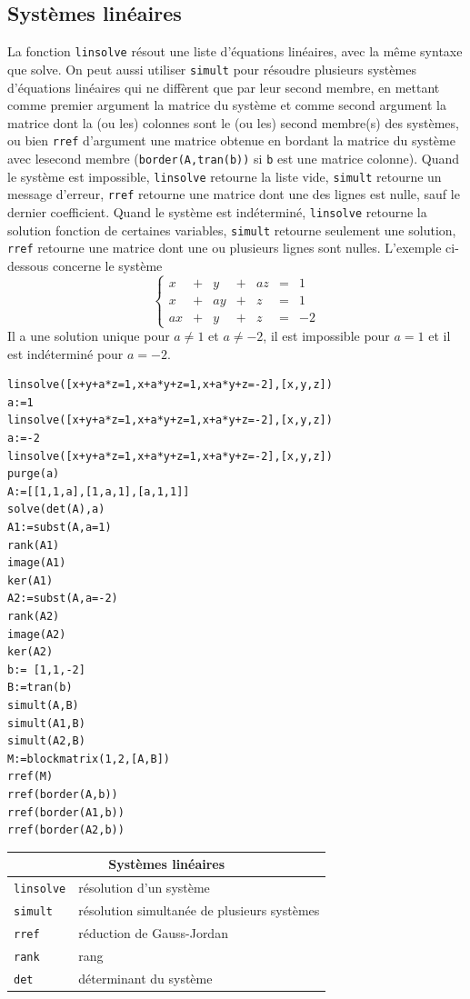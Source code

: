 \documentclass{article}
\begin{document}
\subsection{Syst\`emes lin\'eaires}
%
La fonction \verb|linsolve| r\'esout une liste d'\'equations
lin\'eaires, avec la m\^eme syntaxe que solve. On peut aussi utiliser
\verb|simult|  pour r\'esoudre plusieurs syst\`emes d'\'equations lin\'eaires 
qui ne diff\`erent que par leur second membre, en mettant comme premier 
argument la matrice du syst\`eme et comme second argument la matrice dont la 
(ou les) colonnes sont le (ou les) second membre(s) des syst\`emes, ou bien 
\verb|rref| d'argument une matrice obtenue en bordant la matrice du syst\`eme 
avec lesecond membre ({\tt border(A,tran(b))} si {\tt b} est une matrice 
colonne). Quand le syst\`eme est impossible, \verb|linsolve| retourne
la liste vide, \verb|simult| retourne un message d'erreur, \verb|rref|
retourne une matrice dont une des lignes est nulle, sauf le dernier
coefficient. Quand le syst\`eme est ind\'etermin\'e, \verb|linsolve|
retourne la solution fonction de certaines variables,  \verb|simult|
retourne seulement une solution, \verb|rref| retourne une matrice dont
une ou plusieurs lignes sont nulles. L'exemple ci-dessous concerne
le syst\`eme
$$
\left\{ \begin{array}{llllllr}
 x &+& y &+& az&=&1\\
 x & +& a y&+& z&=&1 \\
 ax & +&y &+& z&=&-2 
\end{array}\right.
$$
Il a une solution unique pour $a\neq 1$ et  $a\neq -2$, il est impossible pour
$a=1$ et il est ind\'etermin\'e pour $a=-2$.
\begin{verbatim}
linsolve([x+y+a*z=1,x+a*y+z=1,x+a*y+z=-2],[x,y,z])
a:=1
linsolve([x+y+a*z=1,x+a*y+z=1,x+a*y+z=-2],[x,y,z])
a:=-2
linsolve([x+y+a*z=1,x+a*y+z=1,x+a*y+z=-2],[x,y,z])
purge(a)
A:=[[1,1,a],[1,a,1],[a,1,1]]
solve(det(A),a)
A1:=subst(A,a=1)
rank(A1)
image(A1)
ker(A1)
A2:=subst(A,a=-2)
rank(A2)
image(A2)
ker(A2)
b:= [1,1,-2]
B:=tran(b)
simult(A,B)
simult(A1,B)
simult(A2,B)
M:=blockmatrix(1,2,[A,B])
rref(M)
rref(border(A,b))
rref(border(A1,b))
rref(border(A2,b))
\end{verbatim}

\begin{center}
\begin{tabular}{|ll|}
\hline
\multicolumn{2}{|c|}{\bf Syst\`emes lin\'eaires}\\
\hline\hline
\verb|linsolve| & r\'esolution d'un syst\`eme\\
\verb|simult| & r\'esolution simultan\'ee de plusieurs syst\`emes\\
\verb|rref| & r\'eduction de Gauss-Jordan\\
\verb|rank| &rang\\
\verb|det| & d\'eterminant du syst\`eme\\
\hline
\end{tabular}
\end{center}
%
\end{document}

